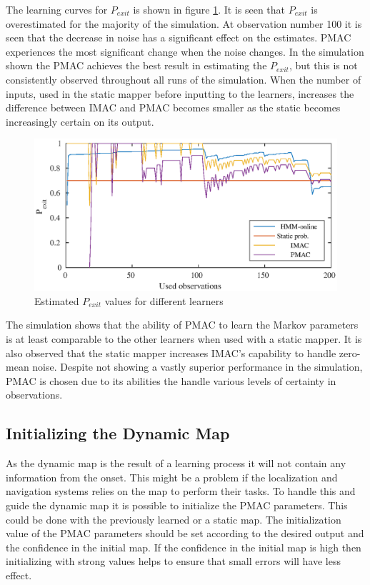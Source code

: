 The learning curves for \(P_{exit}\) is shown in figure \ref{fig:markow_learning_pmac_comparison_exit}. 
It is seen that \(P_{exit}\) is overestimated for the majority of the simulation. 
At observation number 100 it is seen that the decrease in noise has a significant effect on the estimates. 
PMAC experiences the most significant change when the noise changes. 
In the simulation shown the PMAC achieves the best result in estimating the \(P_{exit}\), but this is not consistently observed throughout all runs of the simulation. 
When the number of inputs, used in the static mapper before inputting to the learners, increases the difference between IMAC and PMAC becomes smaller as the static becomes increasingly certain on its output. 

\begin{figure}[H]
	\centering
	\includegraphics[scale=1]{chapters/mapping_of_dynamic_areas/figures/pmac_imac_hmm_exit}
	\caption{Estimated \(P_{exit}\) values for different learners}
	\label{fig:markow_learning_pmac_comparison_exit}
\end{figure}

The simulation shows that the ability of PMAC to learn the Markov parameters is at least comparable to the other learners when used with a static mapper. It is also observed that the static mapper increases IMAC's capability to handle zero-mean noise.
Despite not showing a vastly superior performance in the simulation, PMAC is chosen due to its abilities the handle various levels of certainty in observations. 

\subsection{Initializing the Dynamic Map}
As the dynamic map is the result of a learning process it will not contain any information from the onset. 
This might be a problem if the localization and navigation systems relies on the map to perform their tasks.
To handle this and guide the dynamic map it is possible to initialize the PMAC parameters. 
This could be done with the previously learned or a static map.
The initialization value of the PMAC parameters should be set according to the desired output and the confidence in the initial map.
If the confidence in the initial map is high then initializing with strong values helps to ensure that small errors will have less effect.